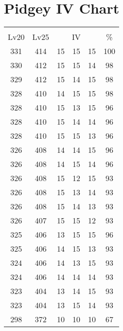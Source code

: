 \documentclass{article}%
\begin{document}
%
\normalsize%
\section{Pidgey IV Chart}%
\label{sec:Pidgey IV Chart}%
\renewcommand{\arraystretch}{1.5}%
\begin{tabular}{|c|c|c|c|c|c|}%
\hline%
\multicolumn{6}{|c|}{\textcolor{white}{ 
\linebreak{Pidgey}
}%
\cellcolor{black}}\\%
\multicolumn{1}{|c}{Lv20}&\multicolumn{1}{c|}{Lv25}&\multicolumn{3}{c|}{IV}&\multicolumn{1}{|c|}{\%}\\%
\hline%
\rowcolor{color100}%
331&414&15&15&15&100\\%
\hline%
\rowcolor{color98}%
330&412&15&15&14&98\\%
\hline%
\rowcolor{color98}%
329&412&15&14&15&98\\%
\hline%
\rowcolor{color98}%
328&410&14&15&15&98\\%
\hline%
\rowcolor{color96}%
328&410&15&13&15&96\\%
\hline%
\rowcolor{color96}%
328&410&15&14&14&96\\%
\hline%
\rowcolor{color96}%
328&410&15&15&13&96\\%
\hline%
\rowcolor{color96}%
326&408&14&14&15&96\\%
\hline%
\rowcolor{color96}%
326&408&14&15&14&96\\%
\hline%
\rowcolor{color93}%
326&408&15&12&15&93\\%
\hline%
\rowcolor{color93}%
326&408&15&13&14&93\\%
\hline%
\rowcolor{color93}%
326&408&15&14&13&93\\%
\hline%
\rowcolor{color93}%
326&407&15&15&12&93\\%
\hline%
\rowcolor{color96}%
325&406&13&15&15&96\\%
\hline%
\rowcolor{color93}%
325&406&14&15&13&93\\%
\hline%
\rowcolor{color93}%
324&406&14&13&15&93\\%
\hline%
\rowcolor{color93}%
324&406&14&14&14&93\\%
\hline%
\rowcolor{color93}%
323&404&13&14&15&93\\%
\hline%
\rowcolor{color93}%
323&404&13&15&14&93\\%
\hline%
\rowcolor{color91}%
298&372&10&10&10&67\\%
\end{tabular}

%
\end{document}
